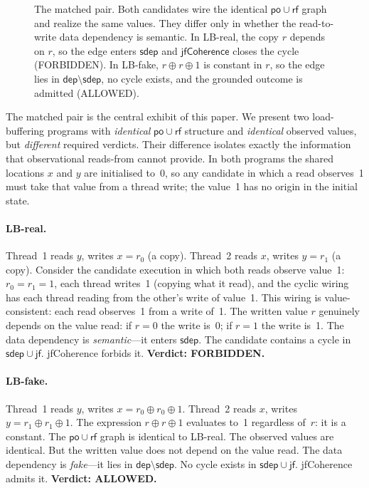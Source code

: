 \documentclass{llncs}
\newcommand{\sdep}{\mathsf{sdep}}
\newcommand{\dep}{\mathsf{dep}}
\newcommand{\rf}{\mathsf{rf}}
\newcommand{\jf}{\mathsf{jf}}
\newcommand{\po}{\mathsf{po}}
\newcommand{\jfCoherence}{\textsf{jfCoherence}}
\begin{document}
\begin{figure}[t]
\caption{The matched pair. Both candidates wire the identical
$\po \cup \rf$ graph and realize the same values. They differ only in whether
the read-to-write data dependency is semantic. In LB-real, the copy $r$ depends on
$r$, so the edge enters $\sdep$ and $\jfCoherence$ closes the cycle
(FORBIDDEN). In LB-fake, $r \oplus r \oplus 1$ is constant in $r$, so the edge
lies in $\dep \setminus \sdep$, no cycle exists, and the grounded outcome is
admitted (ALLOWED).}
\label{fig:matched-pair}
\end{figure}

The matched pair is the central exhibit of this paper. We present two
load-buffering programs with \emph{identical} $\po \cup \rf$ structure and
\emph{identical} observed values, but \emph{different} required verdicts.
Their difference isolates exactly the information that observational
reads-from cannot provide. In both programs the shared locations $x$ and $y$
are initialised to~0, so any candidate in which a read observes~1 must take
that value from a thread write; the value~1 has no origin in the initial
state.

\paragraph{LB-real.}
Thread~1 reads $y$, writes $x = r_0$ (a copy). Thread~2 reads $x$, writes
$y = r_1$ (a copy). Consider the candidate execution in which both reads
observe value~1: $r_0 = r_1 = 1$, each thread writes~1 (copying what it
read), and the cyclic wiring has each thread reading from the other's write
of value~1. This wiring is value-consistent: each read observes~1 from a
write of~1. The written value $r$ genuinely depends on the value read: if
$r = 0$ the write is~0; if $r = 1$ the write is~1. The data dependency is
\emph{semantic}---it enters $\sdep$. The candidate contains a cycle in
$\sdep \cup \jf$. \jfCoherence{} forbids it. \textbf{Verdict: FORBIDDEN.}

\paragraph{LB-fake.}
Thread~1 reads $y$, writes $x = r_0 \oplus r_0 \oplus 1$. Thread~2
reads $x$, writes $y = r_1 \oplus r_1 \oplus 1$. The expression
$r \oplus r \oplus 1$ evaluates to~1 regardless of~$r$: it is a
constant. The $\po \cup \rf$ graph is identical to LB-real. The
observed values are identical. But the written value does not depend
on the value read. The data dependency is \emph{fake}---it lies in
$\dep \setminus \sdep$. No cycle exists in $\sdep \cup \jf$.
\jfCoherence{} admits it. \textbf{Verdict: ALLOWED.}
\end{document}
